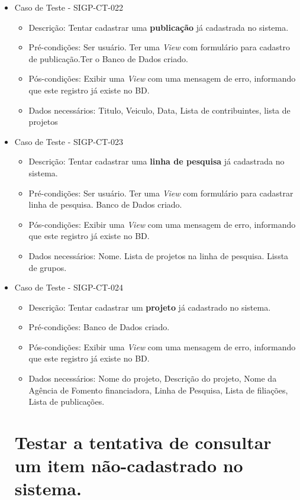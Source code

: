 \documentclass[11pt, a4paper]{book}
\begin{document}
\begin{itemize}
	\item Caso de Teste - SIGP-CT-022
	\begin{itemize}
	\item Descrição: Tentar cadastrar uma \textbf{publicação} já cadastrada no sistema.
	\item Pré-condições: Ser usuário. Ter uma \emph{View} com formulário para cadastro de publicação.Ter o Banco de Dados criado.
	\item Pós-condições: Exibir uma \emph{View} com uma mensagem de erro, informando que este registro já existe no BD.
	\item Dados necessários: Titulo, Veiculo, Data, Lista de contribuintes, lista de projetos
	\end{itemize}

	\item Caso de Teste - SIGP-CT-023
	\begin{itemize}
	\item Descrição: Tentar cadastrar uma \textbf{linha de pesquisa} já cadastrada no sistema.
	\item Pré-condições: Ser usuário. Ter uma \emph{View} com formulário para cadastrar linha de pesquisa. Banco de Dados criado.
		\item Pós-condições: Exibir uma \emph{View} com uma mensagem de erro, informando que este registro já existe no BD.
	\item Dados necessários: Nome. Lista de projetos na linha de pesquisa. Lissta de grupos.
	\end{itemize}

	\item Caso de Teste - SIGP-CT-024
	\begin{itemize}
	\item Descrição: Tentar cadastrar um \textbf{projeto} já cadastrado no sistema.
	\item Pré-condições: Banco de Dados criado.
	\item Pós-condições: Exibir uma \emph{View} com uma mensagem de erro, informando que este registro já existe no BD.
	\item Dados necessários: Nome do projeto, Descrição do projeto, Nome da Agência de Fomento financiadora, Linha de Pesquisa, Lista de filiações, Lista de publicações.
	\end{itemize}

\newpage
\section{Testar a tentativa de consultar um item não-cadastrado no sistema.}


\end{itemize}
\end{document}
